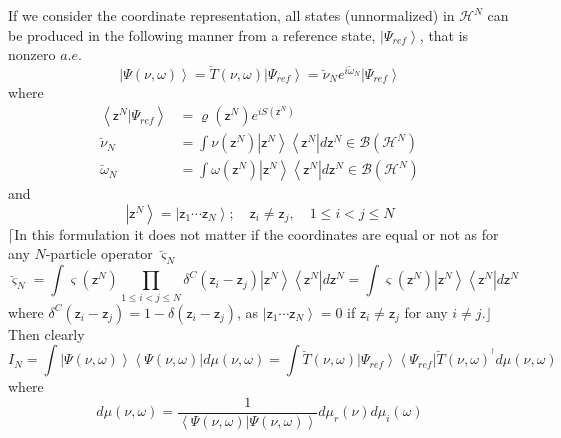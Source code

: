 \documentclass[aps,preprint]{revtex4}%
\begin{document}
If we consider the coordinate representation, all states (unnormalized) in
$\mathcal{H}^{N}$ can be produced in the following manner from a reference
state, $\left\vert \Psi_{ref}\right\rangle $, that is nonzero $a.e.$
\begin{equation}
\left\vert \Psi\left(  \nu,\omega\right)  \right\rangle =\breve{T}\left(
\nu,\omega\right)  \left\vert \Psi_{ref}\right\rangle =\breve{\nu}%
_{N}e^{i\breve{\omega}_{N}}\left\vert \Psi_{ref}\right\rangle
\end{equation}
where
\begin{align}
\left\langle \mathsf{z}^{N}|\Psi_{ref}\right\rangle  &  =\varrho\left(
\mathsf{z}^{N}\right)  e^{iS\left(  \mathsf{z}^{N}\right)  }\nonumber\\
\breve{\nu}_{N}  &  =\int\nu\left(  \mathsf{z}^{N}\right)  \left\vert
\mathsf{z}^{N}\right\rangle \left\langle \mathsf{z}^{N}\right\vert
d\mathsf{z}^{N}\in\mathcal{B}\left(  \mathcal{H}^{N}\right) \\
\breve{\omega}_{N}  &  =\int\omega\left(  \mathsf{z}^{N}\right)  \left\vert
\mathsf{z}^{N}\right\rangle \left\langle \mathsf{z}^{N}\right\vert
d\mathsf{z}^{N}\in\mathcal{B}\left(  \mathcal{H}^{N}\right)
\end{align}
and
\begin{equation}
\left\vert \mathsf{z}^{N}\right\rangle =\left\vert \mathsf{z}_{1}%
\cdots\mathsf{z}_{N}\right\rangle ;\quad\mathsf{z}_{i}\neq\mathsf{z}_{j}%
,\quad1\leq i<j\leq N
\end{equation}
$\lceil$In this formulation it does not matter if the coordinates are equal or
not as for any $N$-particle operator $\breve{\varsigma}_{N}$
\begin{equation}
\breve{\varsigma}_{N}=\int\varsigma\left(  \mathsf{z}^{N}\right)  \prod_{1\leq
i<j\leq N}\delta^{C}\left(  \mathsf{z}_{i}-\mathsf{z}_{j}\right)  \left\vert
\mathsf{z}^{N}\right\rangle \left\langle \mathsf{z}^{N}\right\vert
d\mathsf{z}^{N}=\int\varsigma\left(  \mathsf{z}^{N}\right)  \left\vert
\mathsf{z}^{N}\right\rangle \left\langle \mathsf{z}^{N}\right\vert
d\mathsf{z}^{N}%
\end{equation}
where $\delta^{C}\left(  \mathsf{z}_{i}-\mathsf{z}_{j}\right)  =1-\delta
\left(  \mathsf{z}_{i}-\mathsf{z}_{j}\right)  $, as $\left\vert \mathsf{z}%
_{1}\cdots\mathsf{z}_{N}\right\rangle =0$ if $\mathsf{z}_{i}\neq\mathsf{z}%
_{j}$ for any $i\neq j$.$\rfloor$ Then clearly
\begin{equation}
I_{N}=\int\left\vert \Psi\left(  \nu,\omega\right)  \right\rangle \left\langle
\Psi\left(  \nu,\omega\right)  \right\vert d\mu\left(  \nu,\omega\right)
=\int\breve{T}\left(  \nu,\omega\right)  \left\vert \Psi_{ref}\right\rangle
\left\langle \Psi_{ref}\right\vert \breve{T}\left(  \nu,\omega\right)
^{^{\dagger}}d\mu\left(  \nu,\omega\right)
\end{equation}
where
\begin{equation}
d\mu\left(  \nu,\omega\right)  =\frac{1}{\left\langle \Psi\left(  \nu
,\omega\right)  |\Psi\left(  \nu,\omega\right)  \right\rangle }d\mu_{r}\left(
\nu\right)  d\mu_{i}\left(  \omega\right)
\end{equation}
\qquad\qquad
\end{document}

